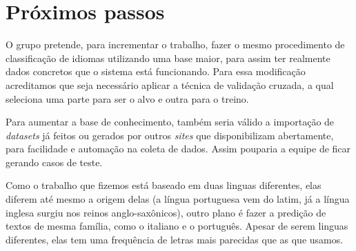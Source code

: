 \section{Próximos passos}
O grupo pretende, para incrementar o trabalho, fazer o mesmo procedimento de classificação de idiomas utilizando uma base maior, para assim ter realmente dados concretos que o sistema está funcionando. Para essa modificação acreditamos que seja necessário aplicar a técnica de validação cruzada, a qual seleciona uma parte para ser o alvo e outra para o treino.

Para aumentar a base de conhecimento, também seria válido a importação de \emph{datasets} já feitos ou gerados por outros \emph{sites} que disponibilizam abertamente, para facilidade e automação na coleta de dados. Assim pouparia a equipe de ficar gerando casos de teste.

Como o trabalho que fizemos está baseado em duas linguas diferentes, elas diferem até mesmo a origem delas (a língua portuguesa vem do latim, já a língua inglesa surgiu nos reinos anglo-saxônicos), outro plano é fazer a predição de textos de mesma família, como o italiano e o português. Apesar de serem linguas diferentes, elas tem uma frequência de letras mais parecidas que as que usamos.

